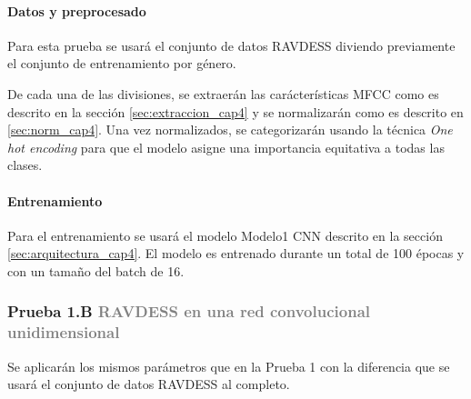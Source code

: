 \documentclass[11pt,a4paper,spanish]{book}
\begin{document}
	\hfill\begin{minipage}{\dimexpr\textwidth-1cm}
		\paragraph{Datos y preprocesado}
		Para esta prueba se usará el conjunto de datos RAVDESS diviendo previamente el conjunto de entrenamiento por género. 
		
		De cada una de las divisiones, se extraerán las carácterísticas MFCC como es descrito en la sección \ref{sec:extraccion_cap4} y se normalizarán como es descrito en \ref{sec:norm_cap4}. Una vez normalizados, se categorizarán usando la técnica \emph{One hot encoding} para que el modelo asigne una importancia equitativa a todas las clases.
		
		\paragraph{Entrenamiento}
		Para el entrenamiento se usará el modelo Modelo1 CNN descrito en la sección \ref{sec:arquitectura_cap4}. El modelo es entrenado durante un total de 100 épocas y con un tamaño del batch de 16.
	\end{minipage}
	

	\subsubsection[]{\large Prueba 1.B {\normalsize \textcolor{Gray}{RAVDESS en una red convolucional unidimensional}}}
	Se aplicarán los mismos parámetros que en la Prueba 1 con la diferencia que se usará el conjunto de datos RAVDESS al completo.
\end{document}
